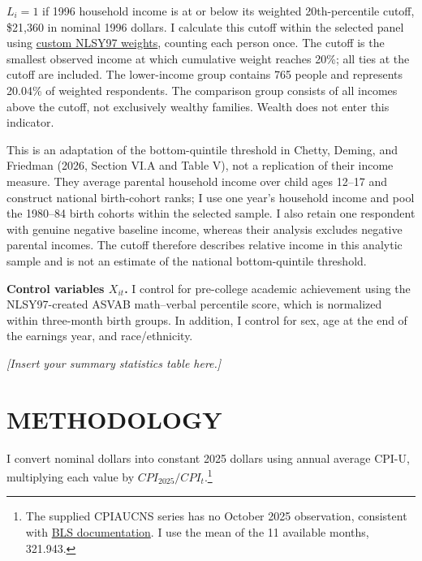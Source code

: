 \documentclass[12pt,letterpaper]{article}
\begin{document}
$L_i=1$ if 1996 household income is at or below its weighted 20th-percentile cutoff,
\$21,360 in nominal 1996 dollars. I calculate this cutoff within the selected panel using
\href{https://www.nlsinfo.org/content/weights/nlsy97}{custom NLSY97 weights}, counting
each person once. The cutoff is the smallest observed income at which cumulative
weight reaches 20\%; all ties at the cutoff are included. The lower-income group
contains 765 people and represents 20.04\% of weighted respondents. The comparison
group consists of all incomes above the cutoff, not exclusively wealthy families.
Wealth does not enter this indicator.

This is an adaptation of the bottom-quintile threshold in Chetty, Deming, and
Friedman (2026, Section VI.A and Table V), not a replication of their income measure.
They average parental household income over child ages 12--17 and construct
national birth-cohort ranks; I use one year's household income and pool the
1980--84 birth cohorts within the selected sample. I also retain one respondent
with genuine negative baseline income, whereas their analysis excludes negative
parental incomes. The cutoff therefore describes relative income in this analytic
sample and is not an estimate of the national bottom-quintile threshold.

\textbf{Control variables $X_{it}$.}
I control for pre-college academic achievement using the NLSY97-created ASVAB
math--verbal percentile score, which is normalized within three-month birth groups.
In addition, I control for sex, age at the end of the earnings year, and race/ethnicity.

\textit{[Insert your summary statistics table here.]}

\section*{METHODOLOGY}
I convert nominal dollars into constant 2025 dollars using annual average CPI-U,
multiplying each value by $CPI_{2025}/CPI_t$.\footnote{The supplied CPIAUCNS series
has no October 2025 observation, consistent with
\href{https://www.bls.gov/news.release/archives/cpi_12182025.htm}{BLS documentation}.
I use the mean of the 11 available months, 321.943.}
\end{document}
